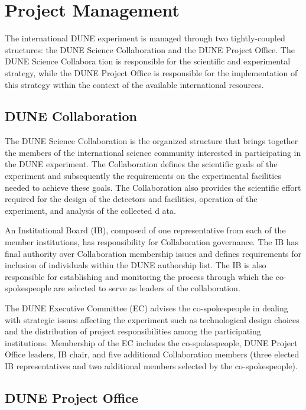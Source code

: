 \chapter{Project Management}
\label{ch:detectors-pm}

The international DUNE experiment is managed through two
tightly-coupled structures: the DUNE Science Collaboration and the
DUNE Project Office.  The DUNE Science Collabora tion is responsible
for the scientific and experimental strategy, while the DUNE Project
Office is responsible for the implementation of this strategy within
the context of the available international resources.

\section{DUNE Collaboration}

The DUNE Science Collaboration is the organized structure that brings
together the members of the international science community interested
in participating in the DUNE experiment.  The Collaboration defines
the scientific goals of the experiment and subsequently the
requirements on the experimental facilities needed to achieve these
goals.  The Collaboration also provides the scientific effort required
for the design of the detectors and facilities, operation of the
experiment, and analysis of the collected d ata.

An Institutional Board (IB), composed of one representative from each
of the member institutions, has responsibility for Collaboration
governance.  The IB has final authority over Collaboration membership
issues and defines requirements for inclusion of individuals within
the DUNE authorship list. The IB is also responsible for establishing
and monitoring the process through which the co-spokespeople are
selected to serve as leaders of the collaboration.

The DUNE Executive Committee (EC) advises the co-spokespeople in
dealing with strategic issues affecting the experiment such as
technological design choices and the distribution of project
responsibilities among the participating institutions.  Membership of
the EC includes the co-spokespeople, DUNE Project Office leaders, IB
chair, and five additional Collaboration members (three elected IB
representatives and two additional members selected by the
co-spokespeople).

\section{DUNE Project Office}

